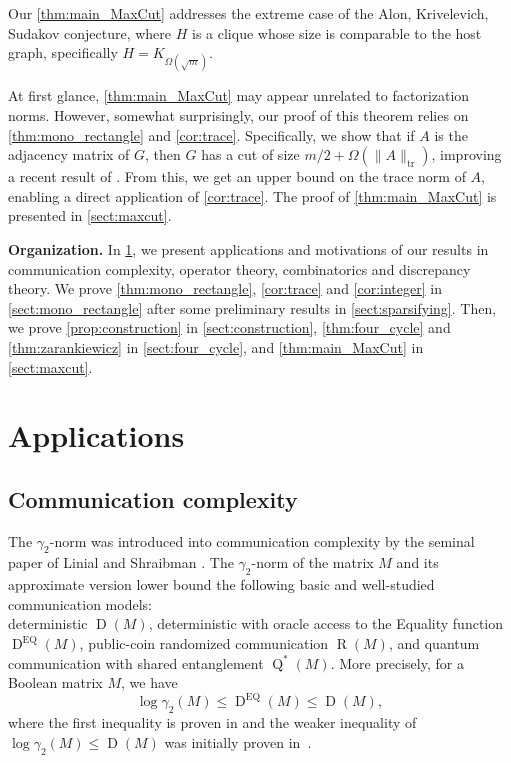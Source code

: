 \documentclass[11pt]{amsart}
\theoremstyle{plain}
\theoremstyle{definition}
\DeclareMathOperator{\tr}{tr}
\DeclareMathOperator{\D}{D}
\DeclareMathOperator{\R}{R}
\DeclareMathOperator{\Q}{Q}
\DeclareMathOperator{\EQ}{EQ}
\begin{document}
Our \cref{thm:main_MaxCut} addresses the extreme case of the Alon, Krivelevich, Sudakov conjecture, where $H$ is a clique whose size is comparable to the host graph, specifically $H=K_{\Omega(\sqrt{m})}$.

At first glance, \cref{thm:main_MaxCut} may appear unrelated to factorization norms.  However, somewhat surprisingly, our proof of this theorem relies on \cref{thm:mono_rectangle} and \cref{cor:trace}. Specifically, we show that if $A$ is the adjacency matrix of $G$, then $G$ has a cut of size $m/2+\Omega(\|A\|_{\tr})$, improving a recent result of \cite{RatyTomon}. From this, we get an upper bound on the trace norm of $A$, enabling a direct application of \cref{cor:trace}. The proof of \cref{thm:main_MaxCut} is presented in \cref{sect:maxcut}.

\medskip
 \textbf{Organization.} In \cref{sect:applications}, we present applications and motivations of our results in communication complexity, operator theory, combinatorics and discrepancy theory. We prove \cref{thm:mono_rectangle}, \cref{cor:trace} and \cref{cor:integer} in \cref{sect:mono_rectangle} after some preliminary results in \cref{sect:sparsifying}. Then, we prove \cref{prop:construction} in \cref{sect:construction}, \cref{thm:four_cycle} and \cref{thm:zarankiewicz} in \cref{sect:four_cycle}, and \cref{thm:main_MaxCut} in \cref{sect:maxcut}.

\section{Applications}\label{sect:applications}


\subsection{Communication complexity}\label{sec:cc}
The $\gamma_2$-norm was introduced into communication complexity by the seminal paper of Linial and Shraibman \cite{LS}. The $\gamma_2$-norm of the matrix $M$ and its approximate version lower bound the following basic and well-studied communication models: \\ deterministic $\D(M)$, deterministic with oracle access to the Equality function $\D^{\EQ}(M)$, public-coin  randomized communication $\R(M)$, and quantum communication with shared entanglement $\Q^{*}(M)$. More precisely, for a Boolean matrix $M$, we have 
\[\log \gamma_2(M) \leq \D^{\EQ}(M) \leq \D(M),\]
where the first inequality is proven in \cite{HHH} and the weaker inequality of $\log \gamma_2(M) \leq \D(M)$ was initially proven in~\cite{LS}.
\end{document}
